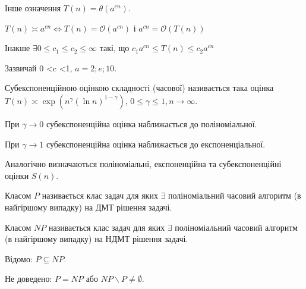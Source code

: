 Інше означення $T(n) = \theta (a^{cn}).$

 $T(n) \asymp a^{cn} \Longleftrightarrow  T(n) = \mathcal O (a^{cn})$ і $ a^{cn} = \mathcal O(T(n))$

Інакше $\exists 0 \le c_1 \le c_2 \le \infty$ такі, що $c_1a^{cn}\leq T(n) \leq c_2a^{cn}$

Зазвичай  0 \textless c \textless 1, $a = 2; e; 10.$ 

 \begin{mydef} Субекспоненційною оцінкою складності (часової) називається така оцінка  $T(n) \asymp \exp (n^\gamma (\ln n)^{1-\gamma})$, $ 0\leq \gamma \leq 1, n \to \infty$. \end{mydef}

При $\gamma \to 0$ субекспоненційна оцінка наближається до поліноміальної.

При $\gamma \to 1$ субекспоненційна оцінка наближається до експоненціальної.

Аналогічно визначаються поліноміальні, експоненційна та субекспоненційні оцінки $S(n)$.

 \begin{mydef}Класом $P$ називається клас задач для яких $\exists$ поліноміальний часовий алгоритм (в найгіршому випадку) на ДМТ рішення задачі. \end{mydef}

 \begin{mydef}Класом $NP$ називається клас задач для яких $\exists$ поліноміальний часовий алгоритм (в найгіршому випадку) на НДМТ рішення задачі. \end{mydef}

Відомо: $P \subseteq NP.$

Не доведено: $ P = NP$ або $NP \backslash P \ne \emptyset$.
